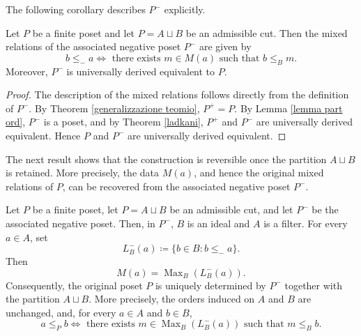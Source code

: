  The following corollary describes $P^-$ explicitly.

\begin{corollary} %
\label{The associated universally derived equivalent poset}
Let $P$ be a finite poset and let $P=A \sqcup B$ be an admissible cut. Then the mixed relations of the associated negative poset $P^-$ are given by
\[b \leq_-a \iff \text{ there exists } m \in M(a) \text{ such that } b \leq_B m.\]
Moreover, $P^-$ is universally derived equivalent to $P$.
\end{corollary}

\begin{proof}
The description of the mixed relations follows directly from the definition of $P^-$.
By Theorem \ref{generalizzazione teomio}, $P^+=P$. By Lemma \ref{lemma part ord}, $P^-$ is a poset, and by Theorem \ref{ladkani}, $P^+$ and $P^-$ are universally derived equivalent. Hence $P$ and $P^-$ are universally derived equivalent.
\end{proof}

The next result shows that the construction is reversible once the partition $A \sqcup B$ is retained. More precisely, the data $M(a)$, and hence the original mixed relations of $P$, can be recovered from the associated negative poset $P^-$.

\begin{proposition}%
\label{Reversibility of the construction}

Let $P$ be a finite poset, let $P=A \sqcup B$ be an admissible cut, and let $P^-$ be the associated negative poset. Then, in $P^-$, $B$ is an ideal and $A$ is a filter. For every $a \in A$, set \[L_B^-(a) \coloneq \{b \in B \colon b \leq_-a\}.\]
Then
\[M(a)=\operatorname{Max}_B(L_B^-(a)).\]
Consequently, the original poset $P$ is uniquely determined by $P^-$ together with the partition $A \sqcup B$. More precisely, the orders induced on $A$ and $B$ are unchanged, and, for every $a \in A$ and $b \in B$,
\[a \leq_Pb \iff \text{ there exists } m \in \operatorname{Max}_B(L^-_B(a)) \text{ such that } m \leq_B b.\]
    
\end{proposition}

